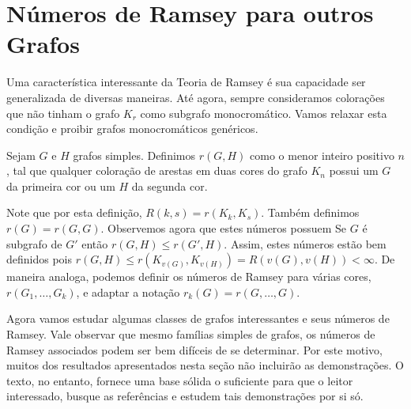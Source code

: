 
\chapter{Números de Ramsey para outros Grafos}
\label{chap:graph}


Uma característica interessante da Teoria de Ramsey é sua capacidade ser generalizada de diversas maneiras. Até agora, sempre consideramos colorações que não tinham o grafo $K_r$ como subgrafo monocromático. Vamos relaxar esta condição e proibir grafos monocromáticos genéricos.

\begin{definition}
Sejam $G$ e $H$ grafos simples. Definimos $r(G,H)$ como o menor inteiro positivo $n$, tal que qualquer coloração de arestas em duas cores do grafo $K_n$ possui um $G$ da primeira cor ou um $H$ da segunda cor.
\end{definition}

Note que por esta definição, $R(k,s) = r(K_k, K_s)$. Também definimos $r(G) = r(G,G)$. Observemos agora que estes números possuem
Se $G$ é subgrafo de $G'$ então $r(G,H) \leq r(G',H)$. Assim, estes números estão bem definidos pois $r(G,H) \leq r(K_{v(G)}, K_{v(H)}) = R(v(G), v(H)) < \infty$. De maneira analoga, podemos definir os números de Ramsey para várias cores, $r(G_1, \dots, G_k)$, e adaptar a notação $r_k(G) = r(G,\dots,G)$.

Agora vamos estudar algumas classes de grafos interessantes e seus números de Ramsey. Vale observar que mesmo famílias simples de grafos, os números de Ramsey associados podem ser bem difíceis de se determinar. Por este motivo, muitos dos resultados apresentados nesta seção não incluirão as demonstrações. O texto, no entanto, fornece uma base sólida o suficiente para que o leitor interessado, busque as referências e estudem tais demonstrações por si só.


